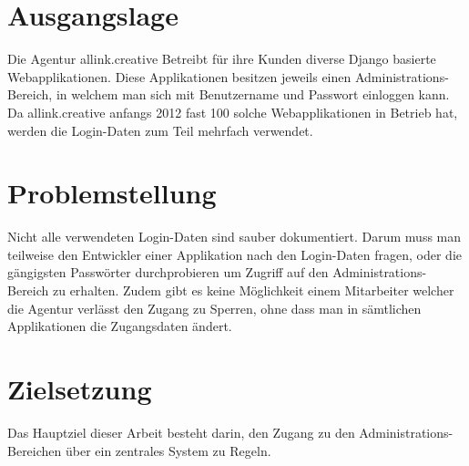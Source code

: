 \section{Ausgangslage}
\label{sec:EinleitungAusgangslage}
Die Agentur allink.creative Betreibt für ihre Kunden diverse Django basierte 
Webapplikationen. Diese Applikationen besitzen jeweils einen 
Administrations-Bereich, in welchem man sich mit Benutzername und Passwort 
einloggen kann. Da allink.creative anfangs 2012 fast 100 solche 
Webapplikationen in Betrieb hat, werden die Login-Daten zum Teil mehrfach 
verwendet.

\section{Problemstellung}
\label{sec:Problemstellung}
Nicht alle verwendeten Login-Daten sind sauber dokumentiert. Darum muss man 
teilweise den Entwickler einer Applikation nach den Login-Daten fragen, oder 
die gängigsten Passwörter durchprobieren um Zugriff auf den 
Administrations-Bereich zu erhalten. Zudem gibt es keine Möglichkeit einem 
Mitarbeiter welcher die Agentur verlässt den Zugang zu Sperren, ohne dass man 
in sämtlichen Applikationen die Zugangsdaten ändert.

\section{Zielsetzung}
\label{sec:Zielsetzung}
Das Hauptziel dieser Arbeit besteht darin, den Zugang zu den Administrations-Bereichen über ein zentrales System zu Regeln.
